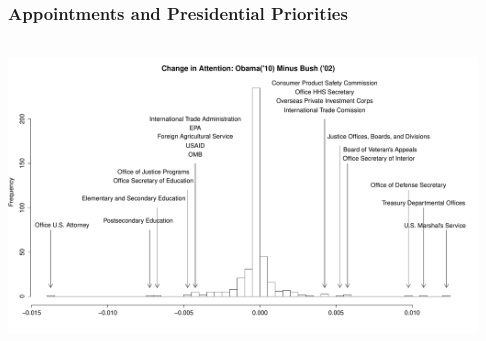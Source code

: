 \documentclass{beamer}
\begin{document}
\begin{frame}[fragile]
\frametitle{Appointments and Presidential Priorities}
\includegraphics[height=3.2in,width=4.9in]{AttentionChange02to10.pdf}
\end{frame}
\end{document}

